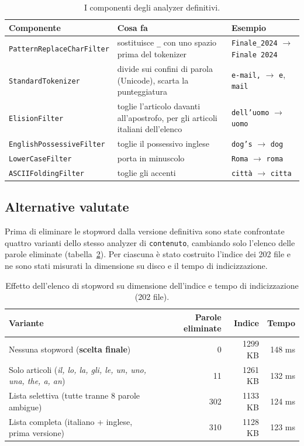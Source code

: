 \documentclass[11pt,a4paper]{article}
\newcommand{\code}[1]{\texttt{#1}}
\newcommand{\field}[1]{\texttt{#1}}
\begin{document}
\begin{table}[!htbp]
\centering
\begin{tabularx}{\linewidth}{@{}lXl@{}}
\toprule
\textbf{Componente} & \textbf{Cosa fa} & \textbf{Esempio} \\
\midrule
\code{PatternReplaceCharFilter} & sostituisce \code{\_} con uno spazio prima del
  tokenizer & \code{Finale\_2024} $\rightarrow$ \code{Finale 2024} \\
\code{StandardTokenizer} & divide sui confini di parola (Unicode), scarta la
  punteggiatura & \code{e-mail,} $\rightarrow$ \code{e}, \code{mail} \\
\code{ElisionFilter} & toglie l'articolo davanti all'apostrofo, per gli articoli
  italiani dell'elenco & \code{dell'uomo} $\rightarrow$ \code{uomo} \\
\code{EnglishPossessiveFilter} & toglie il possessivo inglese &
  \code{dog's} $\rightarrow$ \code{dog} \\
\code{LowerCaseFilter} & porta in minuscolo & \code{Roma} $\rightarrow$ \code{roma} \\
\code{ASCIIFoldingFilter} & toglie gli accenti & \code{città} $\rightarrow$
  \code{citta} \\
\bottomrule
\end{tabularx}
\caption{I componenti degli analyzer definitivi.}
\label{tab:filtri}
\end{table}

\subsection{Alternative valutate}
\label{sec:alternative}

Prima di eliminare le stopword dalla versione definitiva sono state confrontate
quattro varianti dello stesso analyzer di \field{contenuto}, cambiando solo l'elenco
delle parole eliminate (tabella~\ref{tab:stopword}). Per ciascuna è stato costruito
l'indice dei 202 file e ne sono stati misurati la dimensione su disco e il tempo
di indicizzazione.

\begin{table}[!htbp]
\centering
\begin{tabularx}{\linewidth}{@{}Xrrr@{}}
\toprule
\textbf{Variante} & \textbf{Parole eliminate} & \textbf{Indice} & \textbf{Tempo} \\
\midrule
Nessuna stopword (\textbf{scelta finale}) & 0 & 1299 KB & 148 ms \\
Solo articoli (\emph{il, lo, la, gli, le, un, uno, una, the, a, an}) & 11 & 1261 KB & 132 ms \\
Lista selettiva (tutte tranne 8 parole ambigue) & 302 & 1133 KB & 124 ms \\
Lista completa (italiano + inglese, prima versione) & 310 & 1128 KB & 123 ms \\
\bottomrule
\end{tabularx}
\caption{Effetto dell'elenco di stopword su dimensione dell'indice e tempo di
indicizzazione (202 file).}
\label{tab:stopword}
\end{table}
\end{document}
